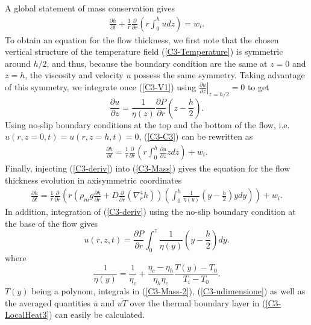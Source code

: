 A global statement of mass conservation gives
\begin{eqnarray}
  \frac{\partial h}{\partial t}+ \frac{1}{r}
  \frac{\partial}{\partial
  r} \left( r\int_0^hudz\right)= w_i.
  \label{C3-C3}
\end{eqnarray}
To obtain an  equation for the flow thickness, we  first note that the
chosen    vertical     structure    of    the     temperature    field
(\ref{C3-Temperature}) is  symmetric around  $h/2$, and  thus, because
the boundary condition are the same  at $z=0$ and $z=h$, the viscosity
and velocity $u$ possess the  same symmetry.  Taking advantage of this
symmetry,      we     integrate      once     (\ref{C3-V1})      using
$\left.\frac{\partial u}{\partial z}\right|_{z=h/2}=0$ to get
\begin{equation}
  \frac{\partial   u}{\partial   z}   =   \frac{1}{\eta(z)}\frac{\partial
    P}{\partial r}\left(z-\frac{h}{2}\right).
  \label{C3-deriv}
\end{equation}
Using no-slip  boundary conditions at  the top  and the bottom  of the
flow, i.e.  $u(r,z=0,t)=u(r,z=h,t)=0$,  (\ref{C3-C3}) can be rewritten
as
\begin{eqnarray}
  \frac{\partial h}{\partial t} = \frac{1}{r}
  \frac{\partial}{\partial
  r} \left( r\int_0^h\frac{\partial u}{\partial z}zdz\right) + w_i.
  \label{C3-Mass}
\end{eqnarray}
Finally,  injecting (\ref{C3-deriv})  into  (\ref{C3-Mass}) gives  the
equation for the flow thickness evolution in axisymmetric coordinates
\begin{eqnarray}
  \frac{\partial h}{\partial t} = \frac{1}{r}
  \frac{\partial}{\partial r} \left( r\left(\rho_m g \frac{\partial h}{\partial      r}+D\frac{\partial}{\partial      r}\left(\nabla_r^4h\right)\right)\left(\int_0^h\frac{1}{\eta(y)}\left(y-\frac{h}{2}\right)ydy\right)\right)
  + w_i.
  \label{C3-Mass-2}
\end{eqnarray}
In  addition,  integration  of   (\ref{C3-deriv})  using  the  no-slip
boundary condition at the base of the flow gives
\begin{equation}
  u(r,z,t)        =        \frac{\partial        P}{\partial        r}
  \int_0^z\frac{1}{\eta(y)}\left(y-\frac{h}{2}\right)dy.
  \label{C3-udimensione}
\end{equation}
where
\begin{equation}
  \frac{1}{\eta(y)} = \frac{1}{\eta_c}+\frac{\eta_c-\eta_h}{\eta_h\eta_c}\frac{T(y)-T_0}{T_i-T_0}.
\end{equation}
$T(y)$    being   a    polynom,   integrals    in   (\ref{C3-Mass-2}),
(\ref{C3-udimensione})   as   well    as   the   averaged   quantities
$\overline{u}$ and $\overline{uT}$ over  the thermal boundary layer in
(\ref{C3-LocalHeat3}) can easily be calculated.


